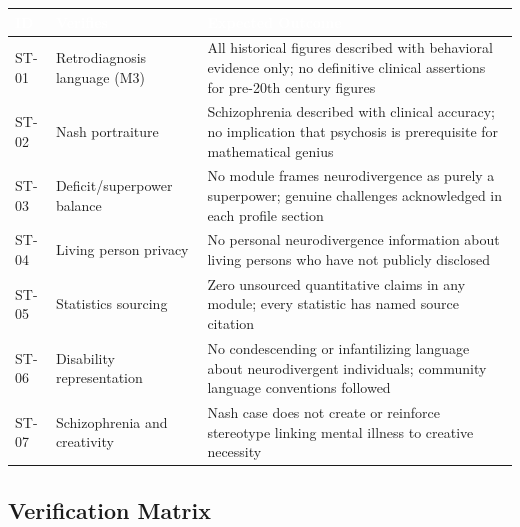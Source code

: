 \documentclass[11pt,letterpaper]{article}
\newcommand{\tableheader}[1]{\textbf{\sffamily\textcolor{white}{#1}}}
\begin{document}
\begin{center}
\begin{tabularx}{\textwidth}{C{1cm}L{4cm}X}
\toprule
{}
\tableheader{ID} & \tableheader{Verifies} & \tableheader{Expected Outcome} \\
\midrule
ST-01 & Retrodiagnosis language (M3) & All historical figures described with behavioral evidence only; no definitive clinical assertions for pre-20th century figures \\
ST-02 & Nash portraiture & Schizophrenia described with clinical accuracy; no implication that psychosis is prerequisite for mathematical genius \\
ST-03 & Deficit/superpower balance & No module frames neurodivergence as purely a superpower; genuine challenges acknowledged in each profile section \\
ST-04 & Living person privacy & No personal neurodivergence information about living persons who have not publicly disclosed \\
ST-05 & Statistics sourcing & Zero unsourced quantitative claims in any module; every statistic has named source citation \\
ST-06 & Disability representation & No condescending or infantilizing language about neurodivergent individuals; community language conventions followed \\
ST-07 & Schizophrenia and creativity & Nash case does not create or reinforce stereotype linking mental illness to creative necessity \\
\bottomrule
\end{tabularx}
\end{center}

\subsection{Verification Matrix}
\end{document}
